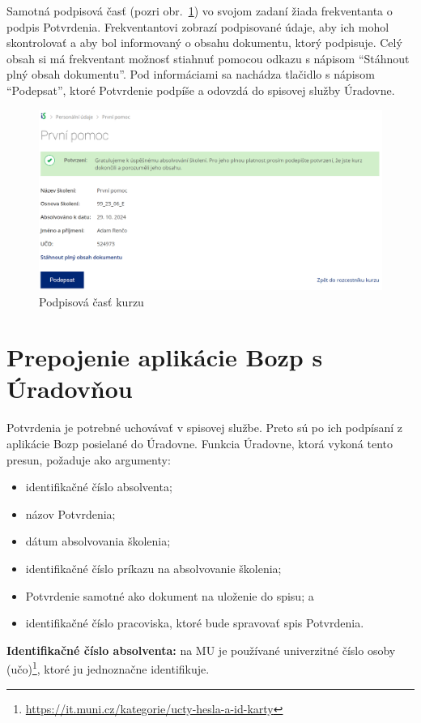 \documentclass[
  digital,     %
  oneside,     %
  nosansbold,  %
  nocolorbold, %
  lof,         %
  nolot,         %
]{fithesis4}
\begin{document}
Samotná podpisová časť (pozri obr.~\ref{obr3}) vo svojom zadaní žiada frekventanta o podpis Potvrdenia. Frekventantovi zobrazí podpisované údaje, aby ich mohol skontrolovať a aby bol informovaný o obsahu dokumentu, ktorý podpisuje. Celý obsah si má frekventant možnosť stiahnuť pomocou odkazu s nápisom \enquote{Stáhnout plný obsah dokumentu}. Pod informáciami sa nachádza tlačidlo s nápisom \enquote{Podepsat}, ktoré Potvrdenie podpíše a odovzdá do spisovej služby Úradovne.

\begin{figure}
  \begin{center}
    \includegraphics[width=\textwidth]{podpiscast2.png}
  \end{center}
  \caption{Podpisová časť kurzu}
  \label{obr3}
\end{figure}

\section{Prepojenie aplikácie Bozp s Úradovňou}
Potvrdenia je potrebné uchovávať v spisovej službe. Preto sú po ich podpísaní z aplikácie Bozp posielané do Úradovne. Funkcia Úradovne, ktorá vykoná tento presun, požaduje ako argumenty:

\begin{itemize}
    \item identifikačné číslo absolventa;
    \item názov Potvrdenia;
    \item dátum absolvovania školenia;
    \item identifikačné číslo príkazu na absolvovanie školenia;
    \item Potvrdenie samotné ako dokument na uloženie do spisu; a
    \item identifikačné číslo pracoviska, ktoré bude spravovať spis Potvrdenia.
\end{itemize}
\noindent
\textbf{Identifikačné číslo absolventa:} na MU je používané univerzitné číslo osoby (učo)\footnote{\url{https://it.muni.cz/kategorie/ucty-hesla-a-id-karty}}, ktoré ju jednoznačne identifikuje.
\end{document}
